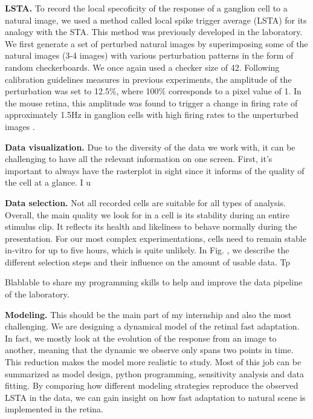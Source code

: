 \textbf{LSTA.}
To record the local specoficity of the response of a ganglion cell to a natural
image, we used a method called local spike trigger average (LSTA) for its
analogy with the STA. This method was previously developed in the laboratory.
We first generate a set of perturbed natural images by superimposing some of
the natural images (3-4 images) with various perturbation patterns in the form
of random checkerboards. We once again used a checker size of 42\microns.
Following calibration guidelines measures in previous experiments, the
amplitude of the perturbation was set to 12.5\%, where 100\% corresponds to a
pixel value of 1. In the mouse retina, this amplitude was found to trigger a
change in firing rate of approximately 1.5Hz in ganglion cells with high firing
rates to the unperturbed images \citep{goldin_context-dependent_2022}.

\textbf{Data visualization.}
Due to the diversity of the data we work with, it can be challenging to have
all the relevant information on one screen. First, it's important to always
have the rasterplot in sight since it informs of the quality of the cell at a
glance. I u

\textbf{Data selection.}
Not all recorded cells are suitable for all types of analysis. Overall, the
main
quality we look for in a cell is its stability during an entire stimulus clip.
It reflects its health and likeliness to behave normally during the
presentation. For our most complex experimentations, cells need to remain
stable in-vitro for up to five hours, which is quite unlikely. In Fig. , we
describe the different selection steps and their influence on the amount of
usable data.
Tp

Blablable to share my programming skills to help and improve the data pipeline
of
the
laboratory.

\textbf{Modeling.} This should be the main part of my internship and also the
most challenging. We are designing a dynamical model of the retinal fast
adaptation. In fact, we mostly look at the evolution of the response from an
image to another, meaning that the dynamic we observe only spans two points in
time. This reduction makes the model more realistic to study. Most of this job
can be summarized as model design, python programming, sensitivity analysis and
data fitting. By comparing how different modeling strategies reproduce the
observed LSTA in the data, we can gain insight on how fast adaptation to
natural scene is implemented in the retina.


